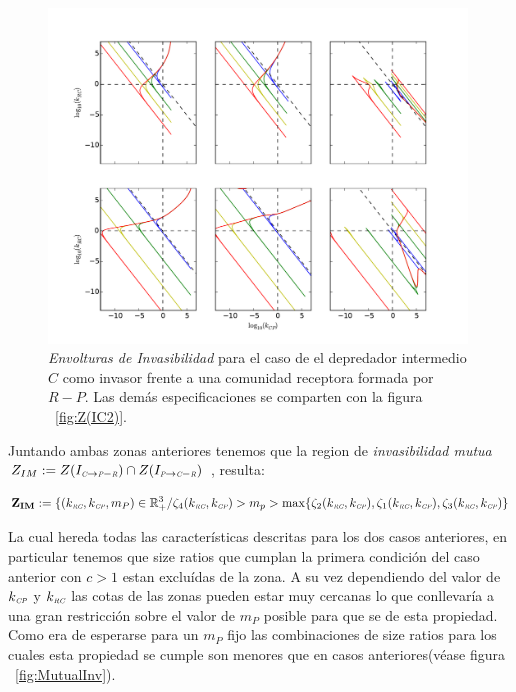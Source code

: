 \begin{figure}
  \centering
  \includegraphics[width = 0.99\textwidth]{./Plots/Z(IC5)AcGrGr.pdf}
  \caption[Env $Z(IC5)$]{\emph{Envolturas de Invasibilidad} para el caso de el depredador intermedio $C$ como invasor frente a una comunidad receptora formada por $R-P$. Las dem\'as especificaciones se comparten con la figura ~\ref{fig:Z(IC2)}.}
  \label{fig:Z(IC5)}
\end{figure}


Juntando ambas zonas anteriores tenemos que la region de \emph{invasibilidad mutua} $Z_{IM} := Z(I_{\textit{\tiny C} \to \textit{\tiny P}-\textit{\tiny R}}) \cap Z(I_{\textit{\tiny P} \to \textit{\tiny C}-\textit{\tiny R}})$ , resulta:


\begin{equation}
\mathbf{Z_{IM}} := \{ (k_{\textit{\tiny RC}},k_{\textit{\tiny CP}},m_P) \in \mathbb{R}^3_+ / \zeta_4(k_{\textit{\tiny RC}},k_{\textit{\tiny CP}}) > m_p > \max \{ \zeta_2(k_{\textit{\tiny RC}},k_{\textit{\tiny CP}}) , \zeta_1(k_{\textit{\tiny RC}},k_{\textit{\tiny CP}}) , \zeta_3(k_{\textit{\tiny RC}},k_{\textit{\tiny CP}}) \}
\end{equation}

La cual hereda todas las caracter\'isticas descritas para los dos casos anteriores, en particular tenemos que size ratios que cumplan la primera condici\'on del caso anterior con $c > 1$ estan exclu\'idas de la zona. A su vez dependiendo del valor de $k_{\textit{\tiny CP}}$ y $k_{\textit{\tiny RC}}$ las cotas de las zonas pueden estar muy cercanas lo que conllevar\'ia a una gran restricci\'on sobre el valor de $m_P$ posible para que se de esta propiedad. Como era de esperarse para un $m_P$ fijo las combinaciones de size ratios para los cuales esta propiedad se cumple son menores que en casos anteriores(v\'ease figura ~\ref{fig:MutualInv}).


